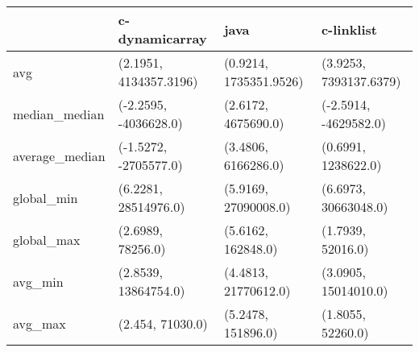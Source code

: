 \begin{tabular}{llll}
\toprule
{} &          c-dynamicarray &                    java &              c-linklist \\
\midrule
avg            &  (2.1951, 4134357.3196) &  (0.9214, 1735351.9526) &  (3.9253, 7393137.6379) \\
median\_median  &   (-2.2595, -4036628.0) &     (2.6172, 4675690.0) &   (-2.5914, -4629582.0) \\
average\_median &   (-1.5272, -2705577.0) &     (3.4806, 6166286.0) &     (0.6991, 1238622.0) \\
global\_min     &    (6.2281, 28514976.0) &    (5.9169, 27090008.0) &    (6.6973, 30663048.0) \\
global\_max     &       (2.6989, 78256.0) &      (5.6162, 162848.0) &       (1.7939, 52016.0) \\
avg\_min        &    (2.8539, 13864754.0) &    (4.4813, 21770612.0) &    (3.0905, 15014010.0) \\
avg\_max        &        (2.454, 71030.0) &      (5.2478, 151896.0) &       (1.8055, 52260.0) \\
\bottomrule
\end{tabular}

